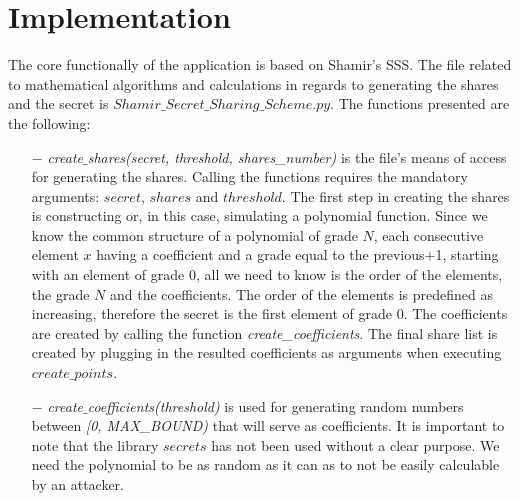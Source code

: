 \documentclass[12pt, a4paper, oneside]{book}
\begin{document}
    \section{Implementation}
    The core functionally of the application is based on Shamir's SSS. The file related to mathematical algorithms and calculations in regards to generating the shares and the secret is $Shamir\_Secret\_Sharing\_Scheme.py$. The functions presented are the following:
    \begin{itemize}
        \item[$-$] {\it create$\_$shares(secret, threshold, shares\_number)} is the file's means of access for generating the shares. Calling the functions requires the mandatory arguments: $secret$, $shares$ and $threshold$. The first step in creating the shares is constructing or, in this case, simulating a polynomial function. Since we know the common structure of a polynomial of grade $N$, each consecutive element $x$ having a coefficient and a grade equal to the previous${+}$1, starting with an element of grade 0, all we need to know is the order of the elements, the grade $N$ and the coefficients. The order of the elements is predefined as increasing, therefore the secret is the first element of grade 0. The coefficients are created by calling the function
        {\it create\_coefficients}. The final share list is created by plugging in the resulted coefficients as arguments when executing $create\_points$.
    \end{itemize}
    \begin{itemize}
        \item[$-$] {\it create$\_$coefficients(threshold)} is used for generating random numbers between {\it [0, MAX\_BOUND)} that will serve as coefficients. It is important to note that the library $secrets$ has not been used without a clear purpose. We need the polynomial to be as random as it can as to not be easily calculable by an attacker.
    \end{itemize}
\end{document}
